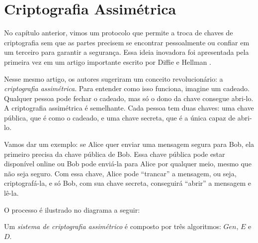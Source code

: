 \chapter{Criptografia Assimétrica}
\label{cha:criptografia-assimetrica}

No capítulo anterior, vimos um protocolo que permite a troca de chaves de criptografia sem que as partes precisem se encontrar pessoalmente ou confiar em um terceiro para garantir a segurança.
Essa ideia inovadora foi apresentada pela primeira vez em um artigo importante escrito por Diffie e Hellman \cite{Diffie76}.

Nesse mesmo artigo, os autores sugeriram um conceito revolucionário: a {\em criptografia assimétrica}.
Para entender como isso funciona, imagine um cadeado.
Qualquer pessoa pode fechar o cadeado, mas só o dono da chave consegue abri-lo.
A criptografia assimétrica é semelhante.
Cada pessoa tem duas chaves: uma chave pública, que é como o cadeado, e uma chave secreta, que é a única capaz de abri-lo.

Vamos dar um exemplo: se Alice quer enviar uma mensagem segura para Bob, ela primeiro precisa da chave pública de Bob.
Essa chave pública pode estar disponível online ou Bob pode enviá-la para Alice por qualquer meio, mesmo que não seja seguro.
Com essa chave, Alice pode ``trancar'' a mensagem, ou seja, criptografá-la, e só Bob, com sua chave secreta, conseguirá ``abrir'' a mensagem e lê-la.

O processo é ilustrado no diagrama a seguir:


\begin{center}
\end{center}

Um \textit{sistema de criptografia assimétrico} é composto por três algoritmos: $Gen$, $E$ e $D$.

